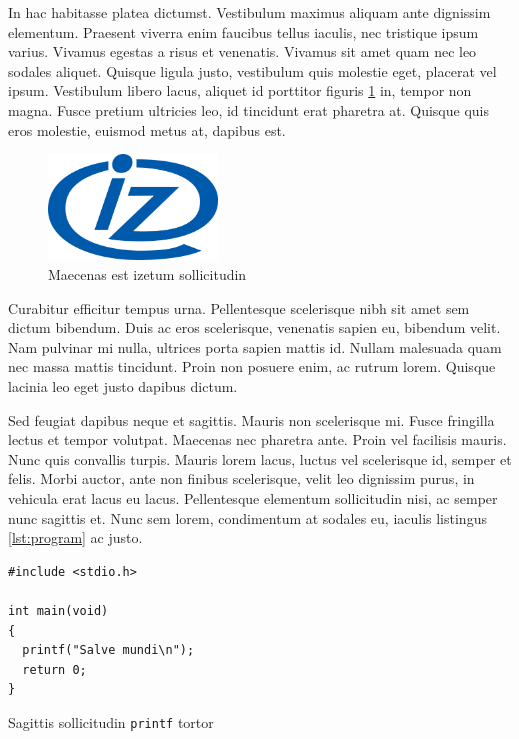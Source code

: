 \documentclass[polish,engineering]{wizthesis}
\begin{document}
In hac habitasse platea dictumst. Vestibulum maximus aliquam ante dignissim elementum. Praesent viverra enim faucibus tellus iaculis, nec tristique ipsum varius. Vivamus egestas a risus et venenatis. Vivamus sit amet quam nec leo sodales aliquet. Quisque ligula justo, vestibulum quis molestie eget, placerat vel ipsum. Vestibulum libero lacus, aliquet id porttitor figuris \ref{fig:iz} in, tempor non magna. Fusce pretium ultricies leo, id tincidunt erat pharetra at. Quisque quis eros molestie, euismod metus at, dapibus est.
\begin{figure}[ht]
  \centering
  \includegraphics[width=0.4\textwidth]{img/iz_logo.png}
  \caption{Maecenas est izetum sollicitudin}
  \label{fig:iz}
\end{figure}

Curabitur efficitur tempus urna. Pellentesque scelerisque nibh sit amet sem dictum bibendum. Duis ac eros scelerisque, venenatis sapien eu, bibendum velit. Nam pulvinar mi nulla, ultrices porta sapien mattis id. Nullam malesuada quam nec massa mattis tincidunt. Proin non posuere enim, ac rutrum lorem. Quisque lacinia leo eget justo dapibus dictum.

Sed feugiat dapibus neque et sagittis. Mauris non scelerisque mi. Fusce fringilla lectus et tempor volutpat. Maecenas nec pharetra ante. Proin vel facilisis mauris. Nunc quis convallis turpis. Mauris lorem lacus, luctus vel scelerisque id, semper et felis. Morbi auctor, ante non finibus scelerisque, velit leo dignissim purus, in vehicula erat lacus eu lacus. Pellentesque elementum sollicitudin nisi, ac semper nunc sagittis et. Nunc sem lorem, condimentum at sodales eu, iaculis listingus \ref{lst:program} ac justo.
\begin{listing}[H]
  \begin{verbatim}
#include <stdio.h>

int main(void)
{
  printf("Salve mundi\n");
  return 0;
}
  \end{verbatim}
  \caption{Sagittis sollicitudin \texttt{printf} tortor}
  \label{lst:program}
\end{listing}
\end{document}
